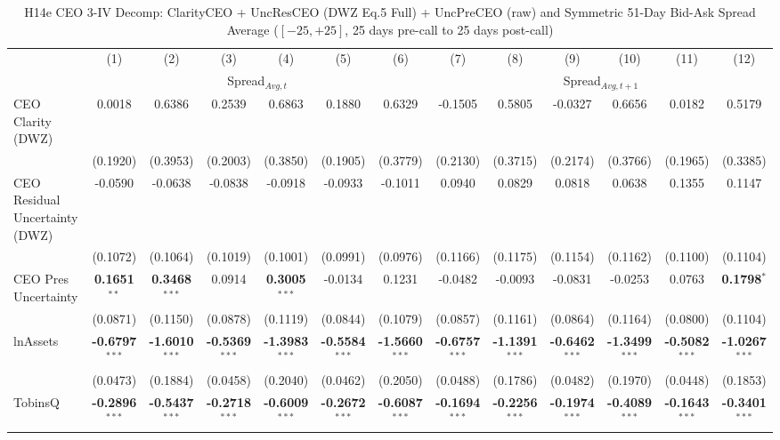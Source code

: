 \begin{landscape}
\begin{table}[H]
\setlength{\tabcolsep}{3pt}
\renewcommand{\arraystretch}{0.85}
\centering
\caption{H14e CEO 3-IV Decomp: ClarityCEO + UncResCEO (DWZ Eq.5 Full) + UncPreCEO (raw) and Symmetric 51-Day Bid-Ask Spread Average ($[-25,+25]$, 25 days pre-call to 25 days post-call)}
\label{tab:h14e_ceo2_decomp}
\scriptsize
\begin{tabular}{lcccccccccccc}
\toprule
 & (1) & (2) & (3) & (4) & (5) & (6) & (7) & (8) & (9) & (10) & (11) & (12) \\
 & \multicolumn{6}{c}{Spread$_{Avg,t}$} & \multicolumn{6}{c}{Spread$_{Avg,t+1}$} \\
\cmidrule(lr){2-7} \cmidrule(lr){8-13}
\midrule
CEO Clarity (DWZ) & 0.0018 & 0.6386 & 0.2539 & 0.6863 & 0.1880 & 0.6329 & -0.1505 & 0.5805 & -0.0327 & 0.6656 & 0.0182 & 0.5179 \\
 & (0.1920) & (0.3953) & (0.2003) & (0.3850) & (0.1905) & (0.3779) & (0.2130) & (0.3715) & (0.2174) & (0.3766) & (0.1965) & (0.3385) \\
CEO Residual Uncertainty (DWZ) & -0.0590 & -0.0638 & -0.0838 & -0.0918 & -0.0933 & -0.1011 & 0.0940 & 0.0829 & 0.0818 & 0.0638 & 0.1355 & 0.1147 \\
 & (0.1072) & (0.1064) & (0.1019) & (0.1001) & (0.0991) & (0.0976) & (0.1166) & (0.1175) & (0.1154) & (0.1162) & (0.1100) & (0.1104) \\
CEO Pres Uncertainty & \textbf{0.1651}$^{**}$ & \textbf{0.3468}$^{***}$ & 0.0914 & \textbf{0.3005}$^{***}$ & -0.0134 & 0.1231 & -0.0482 & -0.0093 & -0.0831 & -0.0253 & 0.0763 & \textbf{0.1798}$^{*}$ \\
 & (0.0871) & (0.1150) & (0.0878) & (0.1119) & (0.0844) & (0.1079) & (0.0857) & (0.1161) & (0.0864) & (0.1164) & (0.0800) & (0.1104) \\
\midrule
lnAssets & \textbf{-0.6797}$^{***}$ & \textbf{-1.6010}$^{***}$ & \textbf{-0.5369}$^{***}$ & \textbf{-1.3983}$^{***}$ & \textbf{-0.5584}$^{***}$ & \textbf{-1.5660}$^{***}$ & \textbf{-0.6757}$^{***}$ & \textbf{-1.1391}$^{***}$ & \textbf{-0.6462}$^{***}$ & \textbf{-1.3499}$^{***}$ & \textbf{-0.5082}$^{***}$ & \textbf{-1.0267}$^{***}$ \\
 & (0.0473) & (0.1884) & (0.0458) & (0.2040) & (0.0462) & (0.2050) & (0.0488) & (0.1786) & (0.0482) & (0.1970) & (0.0448) & (0.1853) \\
TobinsQ & \textbf{-0.2896}$^{***}$ & \textbf{-0.5437}$^{***}$ & \textbf{-0.2718}$^{***}$ & \textbf{-0.6009}$^{***}$ & \textbf{-0.2672}$^{***}$ & \textbf{-0.6087}$^{***}$ & \textbf{-0.1694}$^{***}$ & \textbf{-0.2256}$^{***}$ & \textbf{-0.1974}$^{***}$ & \textbf{-0.4089}$^{***}$ & \textbf{-0.1643}$^{***}$ & \textbf{-0.3401}$^{***}$ \\

\end{tabular}
\end{table}
\end{landscape}
